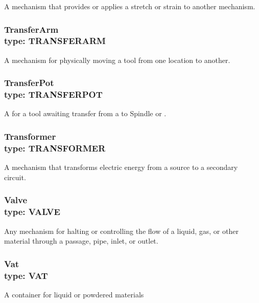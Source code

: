 A mechanism that provides or applies a stretch or strain to another mechanism.


\subsubsection[TransferArm]{TransferArm \\ {\small type: TRANSFER\textunderscore ARM}}
\label{sec:TransferArm}



A mechanism for physically moving a tool from one location to another.


\subsubsection[TransferPot]{TransferPot \\ {\small type: TRANSFER\textunderscore POT}}
\label{sec:TransferPot}



A  for a tool awaiting transfer from a  to \gls{Spindle} or .


\subsubsection[Transformer]{Transformer \\ {\small type: TRANSFORMER}}
\label{sec:Transformer}



A mechanism that transforms electric energy from a source to a secondary circuit.


\subsubsection[Valve]{Valve \\ {\small type: VALVE}}
\label{sec:Valve}



Any mechanism for halting or controlling the flow of a liquid, gas, or other material through a passage, pipe, inlet, or outlet.


\subsubsection[Vat]{Vat \\ {\small type: VAT}}
\label{sec:Vat}



A container for liquid or powdered materials


